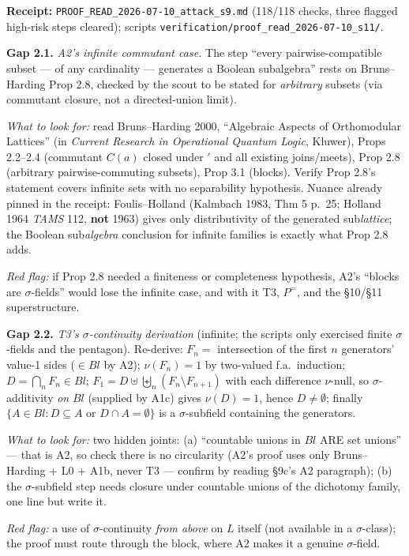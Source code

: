 \documentclass[11pt]{article}
\newcommand{\file}[1]{\texttt{\small #1}}
\newcommand{\gap}[1]{\medskip\noindent\textbf{Gap #1.}}
\newcommand{\lookfor}{\par\smallskip\noindent\emph{What to look for:} }
\newcommand{\redflag}{\par\smallskip\noindent\emph{Red flag:} }
\begin{document}
\noindent\textbf{Receipt:} \file{PROOF\_READ\_2026-07-10\_attack\_s9.md}
(118/118 checks, three flagged high-risk steps cleared);
scripts \file{verification/proof\_read\_2026-07-10\_s11/}.

\gap{2.1} \emph{A2's infinite commutant case.} The step ``every
pairwise-compatible subset --- of any cardinality --- generates a
Boolean subalgebra'' rests on Bruns--Harding Prop 2.8, checked by the
scout to be stated for \emph{arbitrary} subsets (via commutant
closure, not a directed-union limit).
\lookfor read Bruns--Harding 2000, ``Algebraic Aspects of Orthomodular
Lattices'' (in \emph{Current Research in Operational Quantum Logic},
Kluwer), Props 2.2--2.4 (commutant $C(a)$ closed under $'$ and all
existing joins/meets), Prop 2.8 (arbitrary pairwise-commuting subsets),
Prop 3.1 (blocks). Verify Prop 2.8's statement covers infinite sets
with no separability hypothesis. Nuance already pinned in the receipt:
Foulis--Holland (Kalmbach 1983, Thm 5 p.~25; Holland 1964 \emph{TAMS}
112, \textbf{not} 1963) gives only distributivity of the generated
sub\emph{lattice}; the Boolean sub\emph{algebra} conclusion for
infinite families is exactly what Prop 2.8 adds.
\redflag if Prop 2.8 needed a finiteness or completeness hypothesis,
A2's ``blocks are $\sigma$-fields'' would lose the infinite case, and
with it T3, $P^=$, and the \S10/\S11 superstructure.

\gap{2.2} \emph{T3's $\sigma$-continuity derivation} (infinite; the
scripts only exercised finite $\sigma$-fields and the pentagon).
Re-derive: $F_n = $ intersection of the first $n$ generators'
value-1 sides ($\in Bl$ by A2); $\nu(F_n) = 1$ by two-valued f.a.\
induction; $D = \bigcap_n F_n \in Bl$;
$F_1 = D \uplus \biguplus_n (F_n \setminus F_{n+1})$ with each
difference $\nu$-null, so $\sigma$-additivity \emph{on} $Bl$
(supplied by A1c) gives $\nu(D) = 1$, hence $D \neq \emptyset$;
finally $\{A \in Bl : D \subseteq A \text{ or } D \cap A =
\emptyset\}$ is a $\sigma$-subfield containing the generators.
\lookfor two hidden joints: (a) ``countable unions in $Bl$ ARE set
unions'' --- that is A2, so check there is no circularity (A2's proof
uses only Bruns--Harding + L0 + A1b, never T3 --- confirm by reading
\S9c's A2 paragraph); (b) the $\sigma$-subfield step needs closure
under countable unions of the dichotomy family, one line but write it.
\redflag a use of $\sigma$-continuity \emph{from above} on $L$ itself
(not available in a $\sigma$-class); the proof must route through the
block, where A2 makes it a genuine $\sigma$-field.
\end{document}
